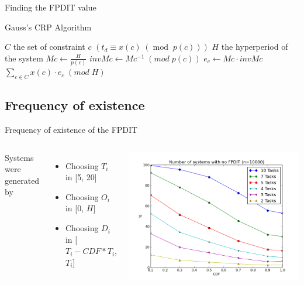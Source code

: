 \documentclass{beamer}
\begin{document}
    \begin{frame}{Finding the FPDIT value}

        \begin{algorithm}[H]
            \caption{Gauss's CRP Algorithm}
            \label{alg:algoCRP}
            \begin{algorithmic}[1]
                \REQUIRE $C$ the set of constraint $c$  $\left( t_d \equiv x(c) \; (\operatorname{mod} \; p(c)) \right)$
                \REQUIRE $H$ the hyperperiod of the system
                    \STATE $Mc \leftarrow \frac{H}{p(c)}$
                    \STATE $invMc \leftarrow Mc^{-1} \; (mod \; p(c))$
                    \STATE $e_c \leftarrow Mc \cdot invMc$
                \ENDFOR
                \RETURN $\sum\limits_{c \in C}{x(c) \cdot e_c} \; (mod \; H)$
            \end{algorithmic}
        \end{algorithm}

    \end{frame}

    \subsection{Frequency of existence}

    \begin{frame}{Frequency of existence of the FPDIT}

    \begin{columns}[c]

        Systems were generated by
        \begin{itemize}
            \item Choosing $T_i$ in [5, 20]
            \item Choosing $O_i$ in [0, $H$]
            \item Choosing $D_i$ in [$T_i - CDF * T_i$, $T_i$]
        \end{itemize}

        \includegraphics[width=\textwidth]{figs/nofpdit_4.png}

    \end{columns}

    \end{frame}
\end{document}
